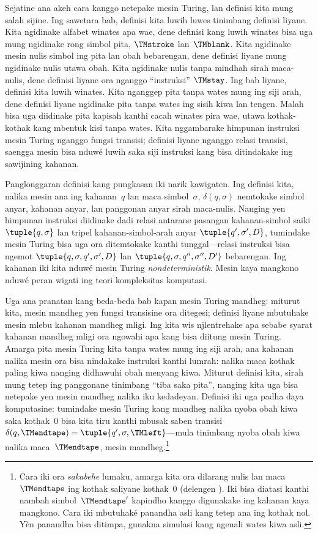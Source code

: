\documentclass[../../../include/open-logic-section]{subfiles}
\begin{document}

Sejatine ana akeh cara kanggo netepake mesin Turing,
lan definisi kita mung salah sijine. Ing sawetara bab,
definisi kita luwih luwes tinimbang definisi liyane.
Kita ngidinake alfabet winates apa wae, dene definisi
kang luwih winates bisa uga mung ngidinake rong simbol
pita, $\TMstroke$ lan~$\TMblank$. Kita ngidinake mesin
nulis simbol ing pita lan obah bebarengan, dene
definisi liyane mung ngidinake nulis utawa obah.
Kita ngidinake nulis tanpa mindhah sirah maca-nulis,
dene definisi liyane ora nganggo ``instruksi''
$\TMstay$. Ing bab liyane, definisi kita luwih
winates. Kita nganggep pita tanpa wates mung ing siji
arah, dene definisi liyane ngidinake pita tanpa wates
ing sisih kiwa lan tengen. Malah bisa uga diidinake
pita kapisah kanthi cacah winates pira wae, utawa kothak-kothak
kang mbentuk kisi tanpa wates. Kita nggambarake
himpunan instruksi mesin Turing nganggo fungsi transisi;
definisi liyane nganggo relasi transisi, saengga mesin
bisa nduwé luwih saka siji instruksi kang bisa ditindakake
ing sawijining kahanan.

Panglonggaran definisi kang pungkasan iki narik kawigaten.
Ing definisi kita, nalika mesin ana ing kahanan~$q$
lan maca simbol~$\sigma$, $\delta(q, \sigma)$
nemtokake simbol anyar, kahanan anyar, lan panggonan
anyar sirah maca-nulis. Nanging yen himpunan instruksi
diidinake dadi relasi antarane pasangan kahanan-simbol
saiki $\tuple{q, \sigma}$ lan tripel kahanan-simbol-arah
anyar $\tuple{q', \sigma', D}$, tumindake mesin Turing
bisa uga ora ditemtokake kanthi tunggal---relasi
instruksi bisa ngemot $\tuple{q, \sigma, q', \sigma', D}$
lan $\tuple{q, \sigma, q'', \sigma'', D'}$ bebarengan.
Ing kahanan iki kita nduwé mesin Turing
\emph{nondeterministik}. Mesin kaya mangkono nduwé
peran wigati ing teori kompleksitas komputasi.

Uga ana pranatan kang beda-beda bab kapan mesin Turing
mandheg: miturut kita, mesin mandheg yen fungsi transisine
ora ditegesi; definisi liyane mbutuhake mesin mlebu
kahanan mandheg mligi. Ing  kita wis
njlentrehake apa sebabe syarat kahanan mandheg mligi
ora ngowahi apa kang bisa diitung mesin Turing.
Amarga pita mesin Turing kita tanpa wates mung ing siji
arah, ana kahanan nalika mesin ora bisa nindakake
instruksi kanthi lumrah: nalika maca kothak paling kiwa
nanging didhawuhi obah menyang kiwa. Miturut definisi
kita, sirah mung tetep ing panggonane tinimbang
``tiba saka pita'', nanging kita uga bisa netepake
yen mesin mandheg nalika iku kedadeyan. Definisi iki
uga padha daya komputasine: tumindake mesin Turing kang
mandheg nalika nyoba obah kiwa saka kothak~$0$ bisa
kita tiru kanthi mbusak saben transisi
$\delta(q,\TMendtape) =
\tuple{q',\sigma,\TMleft}$---mula tinimbang nyoba
obah kiwa nalika maca~$\TMendtape$, mesin mandheg.\footnote{Cara iki
ora \emph{sakabehe} lumaku, amarga kita ora dilarang
nulis lan maca $\TMendtape$ ing kothak saliyane
kothak~$0$ (delengen ). Iki bisa
diatasi kanthi nambah simbol~$\TMendtape'$ kapindho
kanggo digunakake ing kahanan kaya mangkono. Cara iki mbutuhaké panandha asli kang tetep ana ing kothak nol. Yèn panandha bisa ditimpa, gunakna simulasi kang ngenali wates kiwa asli.}
\end{document}
